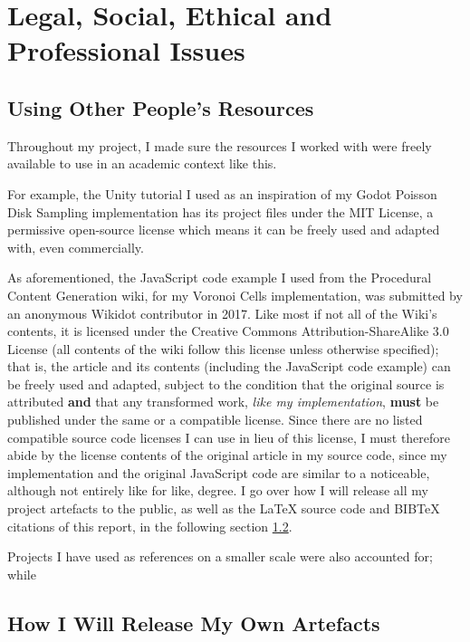 \chapter{Legal, Social, Ethical and Professional Issues} \label{Issues}

\section{Using Other People's Resources}

Throughout my project, I made sure the resources I worked with were freely available to use in an academic context like this.

For example, the Unity tutorial I used as an inspiration of my Godot Poisson Disk Sampling implementation\cite{seblaguetuteYT} has its project files under the MIT License\cite{seblaguetuteGH}, a permissive open-source license which means it can be freely used and adapted with, even commercially.\cite{mitlicense}

As aforementioned, the JavaScript code example I used from the Procedural Content Generation wiki\cite{pcgwikivoronoi}, for my Voronoi Cells implementation, was submitted by an anonymous Wikidot contributor in 2017. Like most if not all of the Wiki's contents, it is licensed under the Creative Commons Attribution-ShareAlike 3.0 License (all contents of the wiki follow this license unless otherwise specified); that is, the article and its contents (including the JavaScript code example) can be freely used and adapted, subject to the condition that the original source is attributed \textbf{and} that any transformed work, \textit{like my implementation}, \textbf{must} be published under the same or a compatible license.\cite{cc_at_sa_3} Since there are no listed compatible source code licenses I can use in lieu of this license\cite{cc_compat}, I must therefore abide by the license contents of the original article in my source code, since my implementation and the original JavaScript code are similar to a noticeable, although not entirely like for like, degree. I go over how I will release all my project artefacts to the public, as well as the \LaTeX{} source code and BIB\TeX{} citations of this report, in the following section \ref{howrelease}.

Projects I have used as references on a smaller scale were also accounted for; while 

\section{How I Will Release My Own Artefacts} \label{howrelease}
